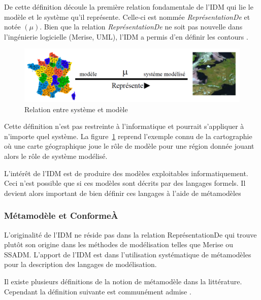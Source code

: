 De cette définition découle la première relation fondamentale de l'IDM qui lie 
le modèle et le système qu'il représente. Celle-ci est nommée 
\textit{ReprésentationDe} et notée $(\mu)$. Bien que la relation 
\textit{ReprésentationDe} ne soit pas nouvelle dans l'ingénierie logicielle 
(Merise, UML), l'IDM a permis d'en définir les contours \cite{atkinson2003model} 
\cite{seidewitz2003models} \cite{bezivin2004search}.

\begin{figure}[!htbp]
 \begin{center}
  \includegraphics[width=1\textwidth]{images/Chapitre1/favresystememodele.png}
 \end{center}
 \caption{Relation entre système et modèle \protect\cite{favre2006ingenierie}}
 \label{fig:systemModele}
\end{figure}

Cette définition n'est pas restreinte à l'informatique et pourrait s'appliquer à 
n'importe quel système. 
La figure~\ref{fig:systemModele} reprend l'exemple connu de la cartographie où 
une carte géographique joue le rôle de modèle pour une région donnée jouant 
alors le rôle de système modélisé. 

L'intérêt de l'IDM est de produire des modèles exploitables informatiquement. 
Ceci n'est possible que si ces modèles sont décrits par des langages formels. Il 
devient alors important de bien définir ces langages à l'aide de métamodèles

\subsubsection{Métamodèle et ConformeÀ}
L'originalité de l'IDM ne réside pas dans la relation ReprésentationDe qui 
trouve plutôt son origine dans les méthodes de modélisation telles que Merise ou 
SSADM. L'apport de l'IDM est dans l'utilisation systématique de métamodèles pour 
la description des langages de modélisation. 

Il existe plusieurs définitions de la notion de métamodèle dans la littérature. 
Cependant la définition suivante est communément admise 
\cite{bezivin2004rapport}.

